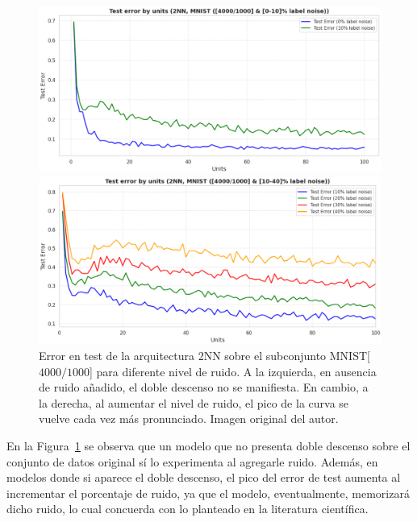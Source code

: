 \begin{figure}[h]
    \centering
    \begin{minipage}{0.45\textwidth}
        \centering
        \includegraphics[width=\linewidth]{img/experiments/noise-wise-dd1.png}
    \end{minipage}
    \begin{minipage}{0.45\textwidth}
        \centering
        \includegraphics[width=\linewidth]{img/experiments/noise-wise-dd2.png}
    \end{minipage}
    \caption[Doble descenso para distintos niveles de ruido.]{Error en test de la arquitectura 2NN sobre el subconjunto MNIST[$4000/1000$] para diferente nivel de ruido. A la izquierda, en ausencia de ruido añadido, el doble descenso no se manifiesta. En cambio, a la derecha, al aumentar el nivel de ruido, el pico de la curva se vuelve cada vez más pronunciado. Imagen original del autor.}\label{fig:noise-wise-dd}
\end{figure}

En la Figura~\ref{fig:noise-wise-dd} se observa que un modelo que no presenta doble descenso sobre el conjunto de datos original sí lo experimenta al agregarle ruido. Además, en modelos donde si aparece el doble descenso, el pico del error de test aumenta al incrementar el porcentaje de ruido, ya que el modelo, eventualmente, memorizará dicho ruido, lo cual concuerda con lo planteado en la literatura científica.\newline

